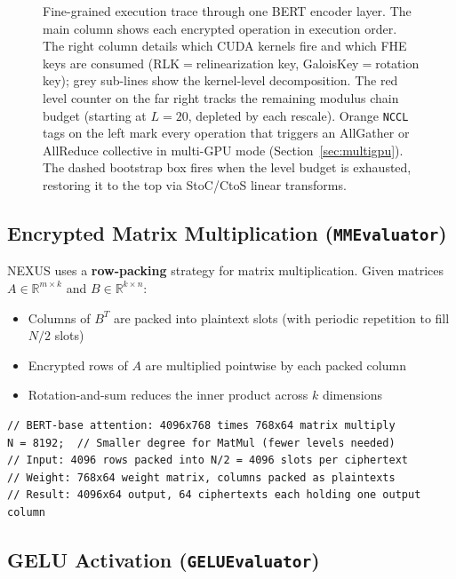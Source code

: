 \documentclass[11pt,letterpaper]{article}
\begin{document}
\begin{figure}[p]
\begin{tikzpicture}
\end{tikzpicture}
\caption{Fine-grained execution trace through one BERT encoder layer.
  The main column shows each encrypted operation in execution order.
  The right column details which CUDA kernels fire and which FHE keys are
  consumed (RLK$=$relinearization key, GaloisKey$=$rotation key); grey
  sub-lines show the kernel-level decomposition.
  The red level counter on the far right tracks the remaining modulus chain
  budget (starting at $L{=}20$, depleted by each rescale).
  Orange \texttt{NCCL} tags on the left mark every operation that triggers
  an AllGather or AllReduce collective in multi-GPU mode
  (Section~\ref{sec:multigpu}).
  The dashed bootstrap box fires when the level budget is exhausted,
  restoring it to the top via StoC/CtoS linear transforms.}
\label{fig:layertrace}
\end{figure}

\subsection{Encrypted Matrix Multiplication (\texttt{MMEvaluator})}

NEXUS uses a \textbf{row-packing} strategy for matrix multiplication. Given matrices $A
\in \mathbb{R}^{m \times k}$ and $B \in \mathbb{R}^{k \times n}$:

\begin{itemize}
  \item Columns of $B^T$ are packed into plaintext slots (with periodic repetition to fill $N/2$ slots)
  \item Encrypted rows of $A$ are multiplied pointwise by each packed column
  \item Rotation-and-sum reduces the inner product across $k$ dimensions
\end{itemize}

\begin{lstlisting}[style=cpp, caption=Matrix multiplication key parameters (main.cu)]
// BERT-base attention: 4096x768 times 768x64 matrix multiply
N = 8192;  // Smaller degree for MatMul (fewer levels needed)
// Input: 4096 rows packed into N/2 = 4096 slots per ciphertext
// Weight: 768x64 weight matrix, columns packed as plaintexts
// Result: 4096x64 output, 64 ciphertexts each holding one output column
\end{lstlisting}

\subsection{GELU Activation (\texttt{GELUEvaluator})}
\end{document}
